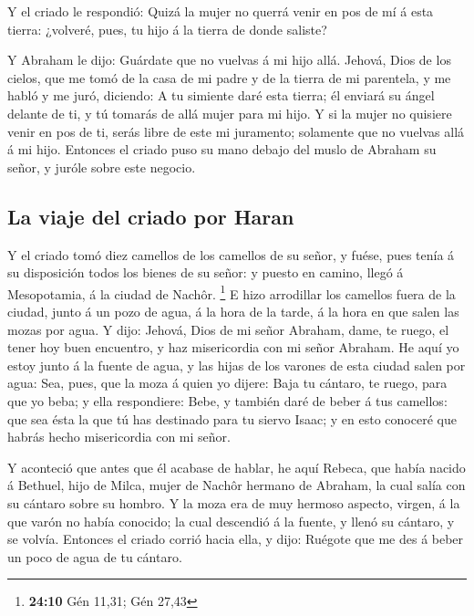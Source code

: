  Y el criado le respondió: Quizá la mujer no querrá venir en
pos de mí á esta tierra: ¿volveré, pues, tu hijo á la tierra de donde
saliste?

 Y Abraham le dijo: Guárdate que no vuelvas á mi hijo allá.
 Jehová, Dios de los cielos, que me tomó de la casa de mi
padre y de la tierra de mi parentela, y me habló y me juró, diciendo: A
tu simiente daré esta tierra; él enviará su ángel delante de ti, y tú
tomarás de allá mujer para mi hijo.  Y si la mujer no
quisiere venir en pos de ti, serás libre de este mi juramento; solamente
que no vuelvas allá á mi hijo.  Entonces el criado puso su
mano debajo del muslo de Abraham su señor, y juróle sobre este negocio.

\hypertarget{la-viaje-del-criado-por-haran}{%
\subsection{La viaje del criado por
Haran}\label{la-viaje-del-criado-por-haran}}

 Y el criado tomó diez camellos de los camellos de su
señor, y fuése, pues tenía á su disposición todos los bienes de su
señor: y puesto en camino, llegó á Mesopotamia, á la ciudad de Nachôr.
\footnote{\textbf{24:10} Gén 11,31; Gén 27,43}  E hizo
arrodillar los camellos fuera de la ciudad, junto á un pozo de agua, á
la hora de la tarde, á la hora en que salen las mozas por agua.
 Y dijo: Jehová, Dios de mi señor Abraham, dame, te ruego,
el tener hoy buen encuentro, y haz misericordia con mi señor Abraham.
 He aquí yo estoy junto á la fuente de agua, y las hijas de
los varones de esta ciudad salen por agua:  Sea, pues, que
la moza á quien yo dijere: Baja tu cántaro, te ruego, para que yo beba;
y ella respondiere: Bebe, y también daré de beber á tus camellos: que
sea ésta la que tú has destinado para tu siervo Isaac; y en esto
conoceré que habrás hecho misericordia con mi señor.

 Y aconteció que antes que él acabase de hablar, he aquí
Rebeca, que había nacido á Bethuel, hijo de Milca, mujer de Nachôr
hermano de Abraham, la cual salía con su cántaro sobre su hombro.
 Y la moza era de muy hermoso aspecto, virgen, á la que
varón no había conocido; la cual descendió á la fuente, y llenó su
cántaro, y se volvía.  Entonces el criado corrió hacia
ella, y dijo: Ruégote que me des á beber un poco de agua de tu cántaro.

